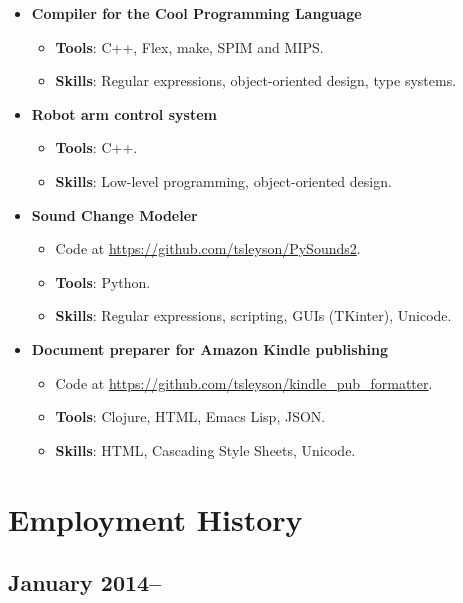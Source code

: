 \documentclass[12pt]{article}
\begin{document}
\begin{itemize}
\item \textbf{Compiler for the Cool Programming Language}
\begin{itemize}
\item \textbf{Tools}: C++, Flex, make, SPIM and MIPS.
\item \textbf{Skills}: Regular expressions, object-oriented design, type systems.
\end{itemize}
\item \textbf{Robot arm control system}
\begin{itemize}
\item \textbf{Tools}: C++.
\item \textbf{Skills}: Low-level programming, object-oriented design.
\end{itemize}
\item \textbf{Sound Change Modeler}
\begin{itemize}
\item Code at \href{https://github.com/tsleyson/PySounds2}{https://github.com/tsleyson/PySounds2}.
\item \textbf{Tools}: Python.
\item \textbf{Skills}: Regular expressions, scripting, GUIs (TKinter), Unicode.
\end{itemize}
\item \textbf{Document preparer for Amazon Kindle publishing}
\begin{itemize}
\item Code at \href{https://github.com/tsleyson/kindle_pub_formatter}{https://github.com/tsleyson/kindle\_pub\_formatter}.
\item \textbf{Tools}: Clojure, HTML, Emacs Lisp, JSON.
\item \textbf{Skills}: HTML, Cascading Style Sheets, Unicode.
\end{itemize}
\end{itemize}
\section*{Employment History}
\label{sec-5}
\subsection*{January 2014–}
\label{sec-5-1}
\end{document}
